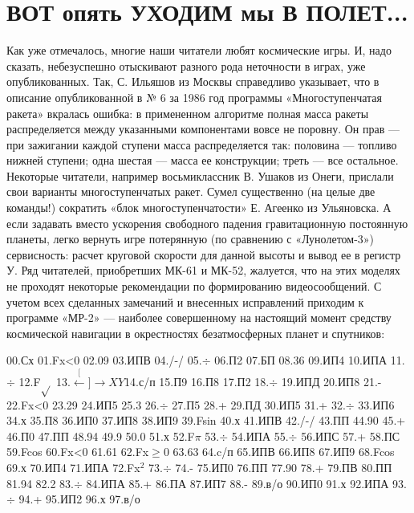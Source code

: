 \documentclass[11pt,a4paper,oneside]{article}
\def\XY{$\stackrel[\leftarrow]{\rightarrow}{XY}$}
\begin{document}
\section{ВОТ опять УХОДИМ мы В ПОЛЕТ...}
Как уже отмечалось, многие наши читатели любят космические игры. И, надо сказать, небезуспешно отыскивают разного рода неточности в играх, уже опубликованных. Так, С. Ильяшов из Москвы справедливо указывает, что в описание опубликованной в № 6 за 1986 год программы «Многоступенчатая ракета» вкралась ошибка: в примененном алгоритме полная масса ракеты распределяется между указанными компонентами вовсе не поровну. Он прав — при зажигании каждой ступени масса распределяется так: половина — топливо нижней ступени; одна шестая — масса ее конструкции; треть — все остальное. Некоторые читатели, например восьмиклассник В. Ушаков из Онеги, прислали свои варианты многоступенчатых ракет. Сумел существенно (на целые две команды!) сократить «блок многоступенчатости» Е. Агеенко из Ульяновска. А если задавать вместо ускорения свободного падения гравитационную постоянную планеты, легко вернуть игре потерянную (по сравнению с «Лунолетом-3») сервисность: расчет круговой скорости для данной высоты и вывод ее в регистр У. Ряд читателей, приобретших МК-61 и МК-52, жалуется, что на этих моделях не проходят некоторые рекомендации по формированию видеосообщений. С учетом всех сделанных замечаний и внесенных исправлений приходим к программе «МР-2» — наиболее совершенному на настоящий момент средству космической навигации в окрестностях безатмосферных планет и спутников:

00.Сх 01.Fx<0 02.09 03.ИПВ 04./-/ 05.$\div$ 06.П2 07.БП 08.36 09.ИП4 10.ИПА 11.$\div$ 12.F$\sqrt{}$ 13.\XY 14.с/п 15.П9
16.П8 17.П2 18.$\div$ 19.ИПД 20.ИП8 21.- 22.Fx<0 23.29 24.ИП5 25.3 26.$\div$ 27.П5 28.+ 29.ПД 30.ИП5 31.+ 32.$\div$ 33.ИП6 34.х 35.П8 36.ИП0 37.ИП8 38.ИП9 39.Fsin 40.х 41.ИПВ 42./-/ 43.ПП 44.90 45.+ 46.П0
47.ПП 48.94 49.9 50.0 51.х 52.F$\pi$ 53.$\div$ 54.ИПА 55.$\div$ 56.ИПС 57.+ 58.ПС 59.Fcos 60.Fx<0 61.61 62.Fx$\geq$0 63.63 64.c/п 65.ИПВ 66.ИП8 67.ИП9 68.Fcos 69.х 70.ИП4 71.ИПА 72.Fx$^{2}$ 73.$\div$ 74.- 75.ИП0 76.ПП 77.90 78.+ 79.ПВ 80.ПП 81.94 82.2 83.$\div$ 84.ИПА 85.+ 86.ПА 87.ИП7 88.- 89.в/о 90.ИП0 91.х 92.ИПА
93.$\div$ 94.+ 95.ИП2 96.х 97.в/о
\end{document}
